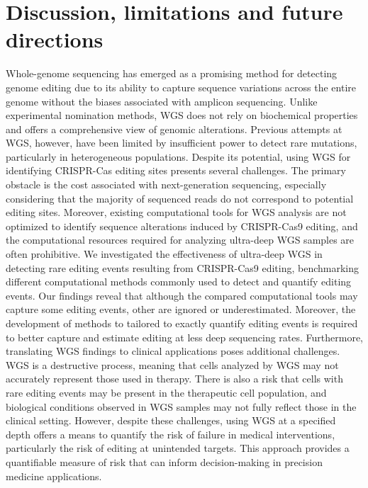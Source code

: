 \documentclass[a4paper, titlepage, openright]{book}
\begin{document}
\section{Discussion, limitations and future directions}
Whole-genome sequencing has emerged as a promising method for detecting genome editing due to its ability to capture sequence variations across the entire genome without the biases associated with amplicon sequencing. Unlike experimental nomination methods, WGS does not rely on biochemical properties and offers a comprehensive view of genomic alterations. Previous attempts at WGS, however, have been limited by insufficient power to detect rare mutations, particularly in heterogeneous populations. Despite its potential, using WGS for identifying CRISPR-Cas editing sites presents several challenges. The primary obstacle is the cost associated with next-generation sequencing, especially considering that the majority of sequenced reads do not correspond to potential editing sites. Moreover, existing computational tools for WGS analysis are not optimized to identify sequence alterations induced by CRISPR-Cas9 editing, and the computational resources required for analyzing ultra-deep WGS samples are often prohibitive. We investigated the effectiveness of ultra-deep WGS in detecting rare editing events resulting from CRISPR-Cas9 editing, benchmarking different computational methods commonly used to detect and quantify editing events. Our findings reveal that although the compared computational tools may capture some editing events, other are ignored or underestimated. Moreover, the development of methods to tailored to exactly quantify editing events is required to better capture and estimate editing at less deep sequencing rates. Furthermore, translating WGS findings to clinical applications poses additional challenges. WGS is a destructive process, meaning that cells analyzed by WGS may not accurately represent those used in therapy. There is also a risk that cells with rare editing events may be present in the therapeutic cell population, and biological conditions observed in WGS samples may not fully reflect those in the clinical setting. However, despite these challenges, using WGS at a specified depth offers a means to quantify the risk of failure in medical interventions, particularly the risk of editing at unintended targets. This approach provides a quantifiable measure of risk that can inform decision-making in precision medicine applications.
\end{document}
